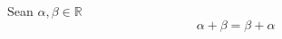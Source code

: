 \documentclass{article}
\begin{document}
  Sean $ \alpha, \beta \in \mathbb{R} $ %
  \begin{equation*} %
    \alpha + \beta = \beta + \alpha
  \end{equation*}
\end{document}

